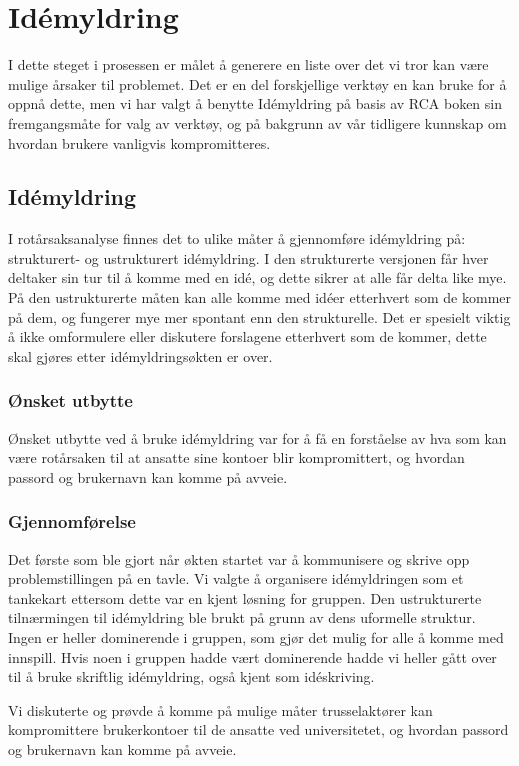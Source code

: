 \chapter{Idémyldring}
I dette steget i prosessen er målet å generere en liste over det vi tror kan være mulige årsaker til problemet. Det er en del forskjellige verktøy en kan bruke for å oppnå dette, men vi har valgt å benytte Idémyldring på basis av RCA boken \cite{RCA} sin fremgangsmåte for valg av verktøy, og på bakgrunn av vår tidligere kunnskap om hvordan brukere vanligvis kompromitteres. 

\section{Idémyldring}
I rotårsaksanalyse finnes det to ulike måter å gjennomføre idémyldring på: strukturert- og ustrukturert idémyldring. I den strukturerte versjonen får hver deltaker sin tur til å komme med en idé, og dette sikrer at alle får delta like mye. På den ustrukturerte måten kan alle komme med idéer etterhvert som de kommer på dem, og fungerer mye mer spontant enn den strukturelle. Det er spesielt viktig å ikke omformulere eller diskutere forslagene etterhvert som de kommer, dette skal gjøres etter idémyldringsøkten er over.

\subsection{Ønsket utbytte}
Ønsket utbytte ved å bruke idémyldring var for å få en forståelse av hva som kan være rotårsaken til at ansatte sine kontoer blir kompromittert, og hvordan passord og brukernavn kan komme på avveie.

\subsection{Gjennomførelse}
Det første som ble gjort når økten startet var å kommunisere og skrive opp problemstillingen på en tavle. Vi valgte å organisere idémyldringen som et tankekart ettersom dette var en kjent løsning for gruppen. Den ustrukturerte tilnærmingen til idémyldring ble brukt på grunn av dens uformelle struktur. Ingen er heller dominerende i gruppen, som gjør det mulig for alle å komme med innspill. Hvis noen i gruppen hadde vært dominerende hadde vi heller gått over til å bruke skriftlig idémyldring, også kjent som idéskriving. 

Vi diskuterte og prøvde å komme på mulige måter trusselaktører kan kompromittere brukerkontoer til de ansatte ved universitetet, og hvordan passord og brukernavn kan komme på avveie.

